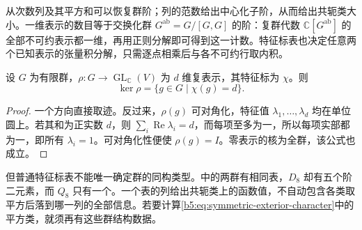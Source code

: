 从次数列及其平方和可以恢复群阶；列的范数给出中心化子阶，从而给出共轭类大小。一维表示的数目等于交换化群 \(G^{\mathrm{ab}}=G/[G,G]\) 的阶：复群代数 \(\mathbb C[G^{\mathrm{ab}}]\) 的全部不可约表示都一维，再用正则分解即可得到这一计数。特征标表也决定任意两个已知表示的张量积分解，只需逐点相乘后与各不可约行取内积。

\begin{proposition}\label{b5:prop:character-kernel}
	设 \(G\) 为有限群，\(\rho:G\to\operatorname{GL}_{\mathbb C}(V)\) 为 \(d\) 维复表示，其特征标为 \(\chi\)。则
	\[
		\ker\rho=\bigl\{g\in G\mid\chi(g)=d\bigr\}.
	\]
\end{proposition}
\begin{proof}
	一个方向直接取迹。反过来，\(\rho(g)\) 可对角化，特征值 \(\lambda_1,\ldots,\lambda_d\) 均在单位圆上。若其和为正实数 \(d\)，则 \(\sum_i\operatorname{Re}\lambda_i=d\)，而每项至多为一，所以每项实部都为一，即所有 \(\lambda_i=1\)。可对角化性便使 \(\rho(g)=I\)。零表示的核为全群，该公式也成立。
\end{proof}

但普通特征标表不能唯一确定群的同构类型。中的两群有相同表，\(D_8\) 却有五个阶二元素，而 \(Q_8\) 只有一个。一个表的列给出共轭类上的函数值，不自动包含各类取平方后落到哪一列的全部信息。若要计算\eqref{b5:eq:symmetric-exterior-character}中的平方类，就须再有这些群结构数据。
